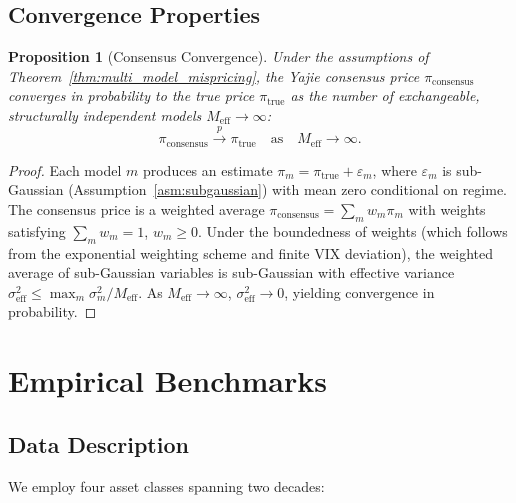 \documentclass[11pt,a4paper]{article}
\theoremstyle{plain}
\newtheorem{proposition}[theorem]{Proposition}
\theoremstyle{definition}
\theoremstyle{remark}
\begin{document}
\subsection{Convergence Properties}

\begin{proposition}[Consensus Convergence]\label{prop:consensus_convergence}
Under the assumptions of Theorem~\ref{thm:multi_model_mispricing}, the Yajie consensus price $\pi_{\text{consensus}}$ converges in probability to the true price $\pi_{\text{true}}$ as the number of exchangeable, structurally independent models $M_{\text{eff}} \to \infty$:
\begin{equation}\label{eq:consensus_convergence}
  \pi_{\text{consensus}} \xrightarrow{p} \pi_{\text{true}} \quad \text{as} \quad M_{\text{eff}} \to \infty.
\end{equation}
\end{proposition}

\begin{proof}
Each model $m$ produces an estimate $\pi_m = \pi_{\text{true}} + \varepsilon_m$, where $\varepsilon_m$ is sub-Gaussian (Assumption~\ref{asm:subgaussian}) with mean zero conditional on regime. The consensus price is a weighted average $\pi_{\text{consensus}} = \sum_m w_m \pi_m$ with weights satisfying $\sum_m w_m = 1$, $w_m \geq 0$. Under the boundedness of weights (which follows from the exponential weighting scheme and finite VIX deviation), the weighted average of sub-Gaussian variables is sub-Gaussian with effective variance $\sigma_{\text{eff}}^2 \leq \max_m \sigma_m^2 / M_{\text{eff}}$. As $M_{\text{eff}} \to \infty$, $\sigma_{\text{eff}}^2 \to 0$, yielding convergence in probability.
\end{proof}

\section{Empirical Benchmarks}

\subsection{Data Description}

We employ four asset classes spanning two decades:
\end{document}
